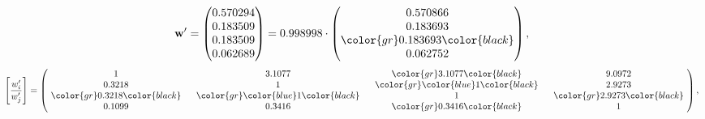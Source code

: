 \begin{example}
\begin{equation*}
\mathbf{w}^{\prime} =
\begin{pmatrix}
0.570294\\
0.183509\\
0.183509\\
0.062689
\end{pmatrix} =
0.998998\cdot
\begin{pmatrix}
0.570866\\
0.183693\\
\color{gr} 0.183693\color{black} \\
0.062752
\end{pmatrix},
\end{equation*}
\begin{equation*}
\left[ \frac{{w}^{\prime}_i}{{w}^{\prime}_j} \right] =
\begin{pmatrix}
$\,\,$ 1 $\,\,$ & $\,\,$3.1077$\,\,$ & $\,\,$\color{gr} 3.1077\color{black} $\,\,$ & $\,\,$9.0972$\,\,$ \\
$\,\,$0.3218$\,\,$ & $\,\,$ 1 $\,\,$ & $\,\,$\color{gr} \color{blue} 1\color{black} $\,\,$ & $\,\,$2.9273  $\,\,$ \\
$\,\,$\color{gr} 0.3218\color{black} $\,\,$ & $\,\,$\color{gr} \color{blue} 1\color{black} $\,\,$ & $\,\,$ 1 $\,\,$ & $\,\,$\color{gr} 2.9273\color{black}  $\,\,$ \\
$\,\,$0.1099$\,\,$ & $\,\,$0.3416$\,\,$ & $\,\,$\color{gr} 0.3416\color{black} $\,\,$ & $\,\,$ 1  $\,\,$ \\
\end{pmatrix},
\end{equation*}
\end{example}
\newpage
